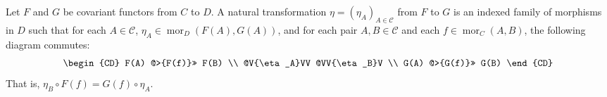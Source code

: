 Let $F$ and $G$ be covariant functors from $C$ to $D$. A natural transformation $\eta = (\eta_A)_{A \in \mathcal{C}}$ from $F$ to $G$ is an indexed family of morphisms in $D$ such that for each $A \in \mathcal{C}$, $\eta_A \in \operatorname{mor}_D(F(A), G(A))$, and for each pair $A, B \in \mathcal{C}$ and each $f \in \operatorname{mor}_C(A, B)$, the following diagram commutes:
$$\begin{CD}
F(A) @>{F(f)}>> F(B) \\
@V{\eta_A}VV @VV{\eta_B}V \\
G(A) @>{G(f)}>> G(B)
\end{CD}$$
That is, $\eta_B \circ F(f) = G(f) \circ \eta_A$.
